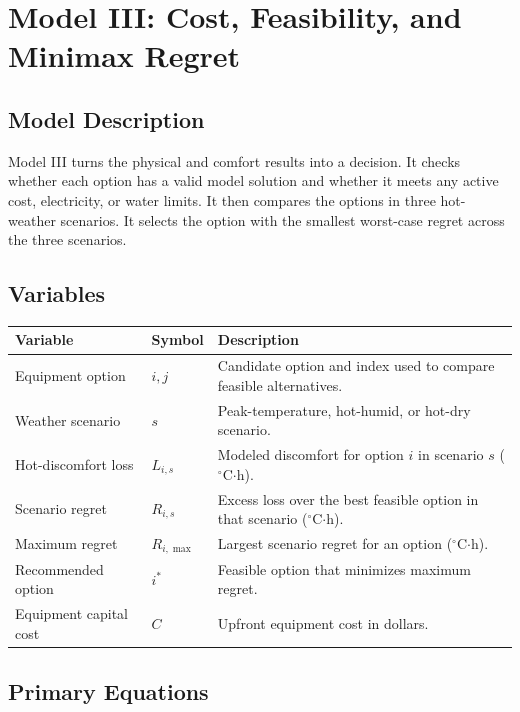 \section{Model III: Cost, Feasibility, and Minimax Regret}
\subsection{Model Description}
 
Model III turns the physical and comfort results into a decision. It checks whether each option has a valid model solution and whether it meets any active cost, electricity, or water limits. It then compares the options in three hot-weather scenarios. It selects the option with the smallest worst-case regret across the three scenarios.
 
\subsection{Variables}
\begin{table}[H]
  \centering
  \renewcommand{\arraystretch}{1.3}
  \begin{tabularx}{\textwidth}{p{}lY}
    \toprule
    \textbf{Variable} & \textbf{Symbol} & \textbf{Description} \\
    \midrule
    Equipment option & $i,j$ & Candidate option and index used to compare feasible alternatives. \\
     Weather scenario & $s$ & Peak-temperature, hot-humid, or hot-dry scenario. \\
    Hot-discomfort loss & $L_{i,s}$ & Modeled discomfort for option $i$ in scenario $s$ ($^\circ$C$\cdot$h). \\
     Scenario regret & $R_{i,s}$ & Excess loss over the best feasible option in that scenario ($^\circ$C$\cdot$h). \\
    Maximum regret & $R_{i,\max}$ & Largest scenario regret for an option ($^\circ$C$\cdot$h). \\
     Recommended option & $i^*$ & Feasible option that minimizes maximum regret. \\
    Equipment capital cost & $C$ & Upfront equipment cost in dollars. \\
    \bottomrule
  \end{tabularx}
\end{table}

\subsection{Primary Equations}
 
